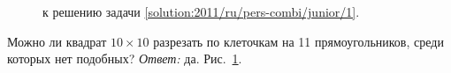 \ifsolution
\begin{figure}\centering
    \caption{к решению задачи \ref{solution:2011/ru/pers-combi/junior/1}.}
    \label{fig:solution:2011/ru/pers-combi/junior/1}
\end{figure}
\fi %

\problem
Можно ли квадрат $10 \times 10$ разрезать по клеточкам на 11 прямоугольников,
среди которых нет подобных?
\solution
\label{solution:2011/ru/pers-combi/junior/1}%
\emph{Ответ:} да.
Рис.~\ref{fig:solution:2011/ru/pers-combi/junior/1}.
\endproblem
